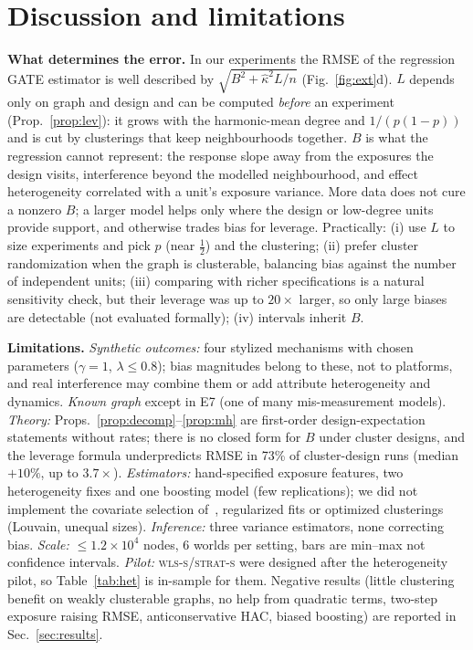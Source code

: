 \section{Discussion and limitations}
\label{sec:disc}

\textbf{What determines the error.} In our experiments the RMSE of the regression GATE estimator is well described by $\sqrt{B^2+\hat\kappa^2L/n}$ (Fig.~\ref{fig:ext}d). $L$ depends only on graph and design and can be computed \emph{before} an experiment (Prop.~\ref{prop:lev}): it grows with the harmonic-mean degree and $1/(p(1-p))$ and is cut by clusterings that keep neighbourhoods together. $B$ is what the regression cannot represent: the response slope away from the exposures the design visits, interference beyond the modelled neighbourhood, and effect heterogeneity correlated with a unit's exposure variance. More data does not cure a nonzero $B$; a larger model helps only where the design or low-degree units provide support, and otherwise trades bias for leverage. Practically: (i) use $L$ to size experiments and pick $p$ (near $\frac12$) and the clustering; (ii) prefer cluster randomization when the graph is clusterable, balancing bias against the number of independent units; (iii) comparing with richer specifications is a natural sensitivity check, but their leverage was up to $20\times$ larger, so only large biases are detectable (not evaluated formally); (iv) intervals inherit $B$.

\textbf{Limitations.} \emph{Synthetic outcomes:} four stylized mechanisms with chosen parameters ($\gamma{=}1$, $\lambda\le0.8$); bias magnitudes belong to these, not to platforms, and real interference may combine them or add attribute heterogeneity and dynamics. \emph{Known graph} except in E7 (one of many mis-measurement models). \emph{Theory:} Props.~\ref{prop:decomp}--\ref{prop:mh} are first-order design-expectation statements without rates; there is no closed form for $B$ under cluster designs, and the leverage formula underpredicts RMSE in 73\% of cluster-design runs (median $+10\%$, up to $3.7\times$). \emph{Estimators:} hand-specified exposure features, two heterogeneity fixes and one boosting model (few replications); we did not implement the covariate selection of~\citep{han2023model}, regularized fits or optimized clusterings (Louvain, unequal sizes). \emph{Inference:} three variance estimators, none correcting bias. \emph{Scale:} $\le1.2\times10^4$ nodes, 6 worlds per setting, bars are min--max not confidence intervals. \emph{Pilot:} \textsc{wls-s}/\textsc{strat-s} were designed after the heterogeneity pilot, so Table~\ref{tab:het} is in-sample for them. Negative results (little clustering benefit on weakly clusterable graphs, no help from quadratic terms, two-step exposure raising RMSE, anticonservative HAC, biased boosting) are reported in Sec.~\ref{sec:results}.
